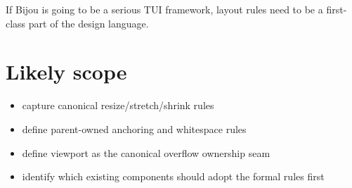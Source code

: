If Bijou is going to be a serious TUI framework, layout rules need to be a first-class part of the design language.

\section{Likely scope}\label{record-296-likely-scope}

\begin{itemize}
\tightlist
\item
  capture canonical resize/stretch/shrink rules
\item
  define parent-owned anchoring and whitespace rules
\item
  define viewport as the canonical overflow ownership seam
\item
  identify which existing components should adopt the formal rules first
\end{itemize}

